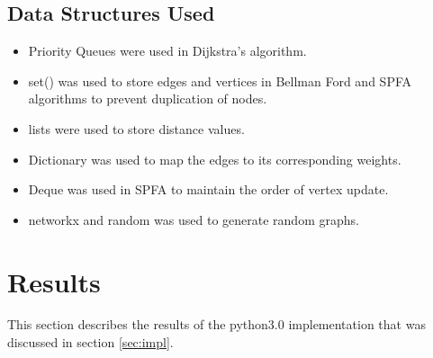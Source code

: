 \documentclass[12pt]{article}
\begin{document}
\subsection{Data Structures Used}
\begin{itemize}
	\item Priority Queues were used in Dijkstra's algorithm.
	\item set() was used to store edges and vertices in Bellman Ford and SPFA algorithms to prevent duplication of nodes.  
	\item lists were used to store distance values. 
	\item Dictionary was used to map the edges to its corresponding weights.
	\item Deque was used in SPFA to maintain the order of vertex update.
	\item networkx and random was used to generate random graphs.
\end{itemize}

\section{Results}
This section describes the results of the python3.0 implementation that was discussed in section \ref{sec:impl}. 
\end{document}
